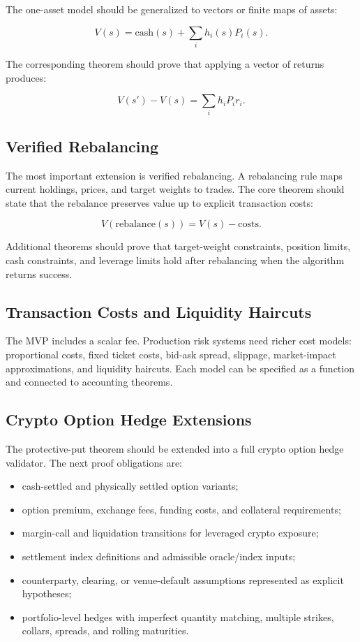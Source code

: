 \documentclass[11pt]{article}
\begin{document}
The one-asset model should be generalized to vectors or finite maps of assets:

\[
  V(s) = \mathrm{cash}(s) + \sum_i h_i(s) P_i(s).
\]

The corresponding theorem should prove that applying a vector of returns
produces:

\[
  V(s') - V(s) = \sum_i h_i P_i r_i.
\]

\subsection{Verified Rebalancing}

The most important extension is verified rebalancing. A rebalancing rule maps
current holdings, prices, and target weights to trades. The core theorem should
state that the rebalance preserves value up to explicit transaction costs:

\[
  V(\mathrm{rebalance}(s)) = V(s) - \mathrm{costs}.
\]

Additional theorems should prove that target-weight constraints, position
limits, cash constraints, and leverage limits hold after rebalancing when the
algorithm returns success.

\subsection{Transaction Costs and Liquidity Haircuts}

The MVP includes a scalar fee. Production risk systems need richer cost
models: proportional costs, fixed ticket costs, bid-ask spread, slippage,
market-impact approximations, and liquidity haircuts. Each model can be
specified as a function and connected to accounting theorems.

\subsection{Crypto Option Hedge Extensions}

The protective-put theorem should be extended into a full crypto option hedge
validator. The next proof obligations are:

\begin{itemize}
  \item cash-settled and physically settled option variants;
  \item option premium, exchange fees, funding costs, and collateral
  requirements;
  \item margin-call and liquidation transitions for leveraged crypto exposure;
  \item settlement index definitions and admissible oracle/index inputs;
  \item counterparty, clearing, or venue-default assumptions represented as
  explicit hypotheses;
  \item portfolio-level hedges with imperfect quantity matching, multiple
  strikes, collars, spreads, and rolling maturities.
\end{itemize}
\end{document}
